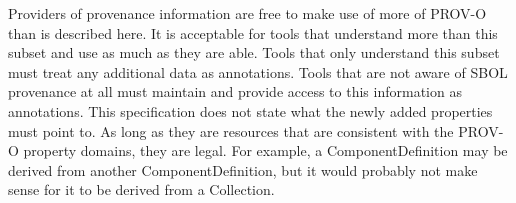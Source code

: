 {%

Providers of provenance information are free to make use of more of PROV-O than is described here. It is acceptable for tools that understand more than this subset and use as much as they are able. Tools that only understand this subset must treat any additional data as annotations. Tools that are not aware of SBOL provenance at all must maintain and provide access to this information as annotations. This specification does not state what the newly added properties must point to. As long as they are resources that are consistent with the PROV-O property domains, they are legal. For example, a ComponentDefinition may be derived from another ComponentDefinition, but it would probably not make sense for it to be derived from a Collection.
}

